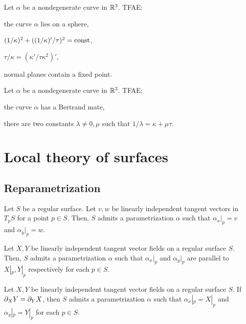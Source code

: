 \documentclass{../note}
\def\a{\alpha}
\begin{document}
\begin{prb}
\begin{prb}
Let $\a$ be a nondegenerate curve in $\mathbb{R}^3$.
TFAE:
\begin{parts}
\item the curve $\a$ lies on a sphere,
\item $(1/\kappa)^2+((1/\kappa)'/\tau)^2=\operatorname{const}$,
\item $\tau/\kappa=(\kappa'/\tau\kappa^2)'$,
\item normal planes contain a fixed point.
\end{parts}
\end{prb}

\begin{prb}
Let $\a$ be a nondegenerate curve in $\mathbb{R}^3$.
TFAE:
\begin{parts}
\item the curve $\a$ has a Bertrand mate,
\item there are two constants $\lambda\ne0,\mu$ such that $1/\lambda=\kappa+\mu\tau$.
\end{parts}
\end{prb}












\chapter{Local theory of surfaces}

\section{Reparametrization}



\begin{thm}
Let $S$ be a regular surface.
Let $v,w$ be linearly independent tangent vectors in $T_pS$ for a point $p\in S$.
Then, $S$ admits a parametrization $\a$ such that $\a_x|_p=v$ and $\a_y|_p=w$.
\end{thm}
\begin{thm}
Let $X,Y$ be linearly independent tangent vector fields on a regular surface $S$.
Then, $S$ admits a parametrization $\a$ such that $\a_x|_p$ and $\a_y|_p$ are parallel to $X|_p,Y|_p$ respectively for each $p\in S$.
\end{thm}
\begin{thm}
Let $X,Y$ be linearly independent tangent vector fields on a regular surface $S$.
If $\pd_XY=\pd_YX$, then $S$ admits a parametrization $\a$ such that $\a_x|_p=X|_p$ and $\a_y|_p=Y|_p$ for each $p\in S$.
\end{thm}


\end{prb}
\end{document}
